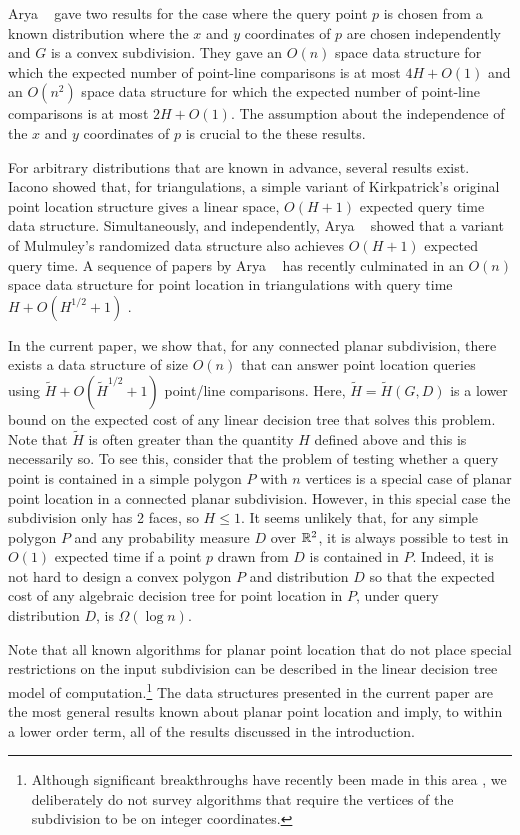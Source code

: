 \documentclass[lotsofwhite]{patmorin}
\begin{document}
Arya \etal\ \cite{acmr00} gave two results for the case where the
query point $p$ is chosen from a known distribution where the $x$ and
$y$ coordinates of $p$ are chosen independently and $G$ is a convex
subdivision.  They gave an $O(n)$ space data structure for which the
expected number of point-line comparisons is at most $4H+O(1)$ and an
$O(n^2)$ space data structure for which the expected number of
point-line comparisons is at most $2H+O(1)$.  The assumption about the
independence of the $x$ and $y$ coordinates of $p$ is crucial to the
these results.

For arbitrary distributions that are known in advance, several results
exist.  Iacono \cite{i01,i04} showed that, for triangulations, a
simple variant of Kirkpatrick's original point location structure
gives a linear space, $O(H+1)$ expected query time data structure.
Simultaneously, and independently, Arya \etal\ \cite{amm01b} showed
that a variant of Mulmuley's randomized data structure also achieves
$O(H+1)$ expected query time.  A sequence of papers by Arya \etal\
\cite{amm00,amm01a,ammw07} has recently culminated in an $O(n)$ space
data structure for point location in triangulations with query time
$H+O(H^{1/2} + 1)$ \cite{ammw07}.

In the current paper, we show that, for any connected planar
subdivision, there exists a data structure of size $O(n)$ that can
answer point location queries using $\tilde H + O(\tilde H^{1/2}+1)$
point/line comparisons.  Here, $\tilde H=\tilde H(G,D)$ is a lower
bound on the expected cost of any linear decision tree that solves
this problem.  Note that $\tilde H$ is often greater than the quantity
$H$ defined above and this is necessarily so.  To see this, consider
that the problem of testing whether a query point is contained in a
simple polygon $P$ with $n$ vertices is a special case of planar point
location in a connected planar subdivision.  However, in this special
case the subdivision only has 2 faces, so $H\le 1$.  It seems unlikely
that, for any simple polygon $P$ and any probability measure $D$ over $\mathbb{R}^2$,
it is always possible to test in $O(1)$ expected time if a point
$p$ drawn from $D$ is contained in $P$.  Indeed, it is not hard to
design a convex polygon $P$ and distribution $D$ so that the expected
cost of any algebraic decision tree for point location in $P$, under
query distribution $D$, is $\Omega(\log n)$.

Note that all known algorithms for planar point location that do not
place special restrictions on the input subdivision can be described
in the linear decision tree model of computation.\footnote{Although
significant breakthroughs have recently been made in this area
\cite{c06,p06}, we deliberately do not survey algorithms that require
the vertices of the subdivision to be on integer coordinates.}  The
data structures presented in the current paper are the most general
results known about planar point location and imply, to within a
lower order term, all of the results discussed in the introduction.
\end{document}
